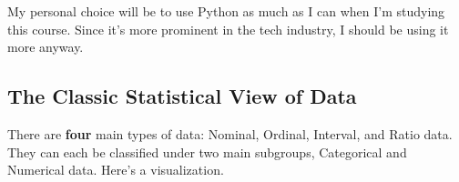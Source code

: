 \documentclass[english, 10pt]{article}
\begin{document}
My personal choice will be to use Python as much as I can when I'm studying this course. Since it's more prominent in the tech industry, I should be using it more anyway.

\subsection{The Classic Statistical View of Data}

There are \textbf{four} main types of data: Nominal, Ordinal, Interval, and Ratio data. They can each be classified under two main subgroups, Categorical and Numerical data. Here's a visualization.\\

{
\centering




\begin{tikzpicture}[x=0.75pt,y=0.75pt,yscale=-1,xscale=1]


\end{tikzpicture}}
\end{document}
